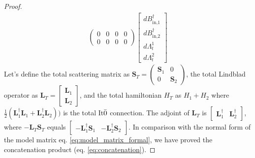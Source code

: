 \documentclass[a4paper]{article}
\theoremstyle{definition}
\begin{document}
\begin{enumerate}[label=(\roman*)]
\begin{proof}
\begin{align}
\begin{pmatrix}
    0 & 0 & 0 & 0 \\
    0 & 0 & 0 & 0
    \end{pmatrix}
    \begin{bmatrix}
    dB^\dagger_\text{in,1} \\
    dB^\dagger_\text{in,2} \\
    d\Lambda^1_t \\
    d\Lambda^2_t
    \end{bmatrix}
\end{align}
Let's define the total scattering matrix as $\textbf{S}_T = \begin{pmatrix}
\textbf{S}_1 & 0 \\
0 & \textbf{S}_2
\end{pmatrix}$, the total Lindblad operator as 
$\textbf{L}_T = \begin{bmatrix}
\textbf{L}_1 \\
\textbf{L}_2
\end{bmatrix}$, and the total hamiltonian $H_T$ as $H_1 +H_2$ where $\frac{1}{2}(\textbf{L}_1^\dagger \textbf{L}_1 + \textbf{L}_2^\dagger \textbf{L}_2))$ is the total It$\Bar{0}$ connection. The adjoint of $\textbf{L}_T$ is $\begin{bmatrix}
\textbf{L}^\dagger_1 & \textbf{L}^\dagger_2
\end{bmatrix}$, where $-\textbf{L}_T\textbf{S}_T$ equals $\begin{bmatrix}
-\textbf{L}^\dagger_1\textbf{S}_1 & -\textbf{L}^\dagger_2 \textbf{S}_2
\end{bmatrix}$. In comparison with the normal form of the model matrix eq. \ref{eq:model_matrix_formal}, we have proved the concatenation product (eq. \ref{eq:concatenation}). 
\end{proof}

\end{enumerate}
\end{document}
